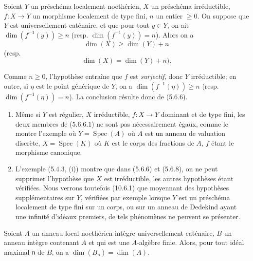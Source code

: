 \begin{corollary}[5.6.8]
\label{IV.2.s5.6.8-fr}
Soient $Y$ un préschéma localement noethérien, $X$ un préschéma
\textup{irréductible}, $f:X\to Y$ un morphisme localement de type fini, $n$ un entier
$\geq0$. On suppose que $Y$ est universellement caténaire, et que pour tout
$y\in Y$, on ait $\dim(f^{-1}(y))\geq n$ \textup{(resp.}
$\dim(f^{-1}(y))=n$\textup{)}. Alors on a
\begin{equation}
\dim(X)\geq\dim(Y)+n
\tag{5.6.8.1}\label{IV.2.s5.6.8.1-fr}
\end{equation}
\textup{(resp.}
\begin{equation}
\dim(X)=\dim(Y)+n).
\tag{5.6.8.2}\label{IV.2.s5.6.8.2-fr}
\end{equation}
\end{corollary}

Comme $n\geq0$, l'hypothèse entraîne que $f$ est \emph{surjectif}, donc $Y$
irréductible; en outre, si $\eta$ est le point générique de $Y$, on a
$\dim(f^{-1}(\eta))\geq n$ (resp. $\dim(f^{-1}(\eta))=n$). La conclusion
résulte donc de (5.6.6).

\begin{remarks}[5.6.9]
\label{IV.2.s5.6.9-fr}
\begin{enumerate}
\item[(i)] Même si $Y$ est régulier, $X$ irréductible, $f:X\to Y$ dominant
et de type fini, les deux membres de (5.6.6.1) ne sont pas nécessairement
égaux, comme le montre l'exemple où $Y=\operatorname{Spec}(A)$ où $A$ est un
anneau de valuation discrète, $X=\operatorname{Spec}(K)$ où $K$ est le corps
des fractions de $A$, $f$ étant le morphisme canonique.
\item[(ii)] L'exemple (5.4.3, (i)) montre que dans (5.6.6) et (5.6.8), on ne
peut supprimer l'hypothèse que $X$ est irréductible, les autres hypothèses
étant vérifiées. Nous verrons toutefois (10.6.1) que moyennant des hypothèses
supplémentaires sur $Y$, vérifiées par exemple lorsque $Y$ est un préschéma
localement de type fini sur un corps, ou sur un anneau de Dedekind ayant une
infinité d'idéaux premiers, de tels phénomènes ne peuvent se présenter.
\end{enumerate}
\end{remarks}

\begin{proposition}[5.6.10]
\label{IV.2.s5.6.10-fr}
Soient $A$ un anneau local noethérien intègre universellement caténaire, $B$
un anneau intègre contenant $A$ et qui est une $A$-algèbre finie. Alors, pour
tout idéal maximal $\mathfrak n$ de $B$, on a
$\dim(B_{\mathfrak n})=\dim(A)$.
\end{proposition}

